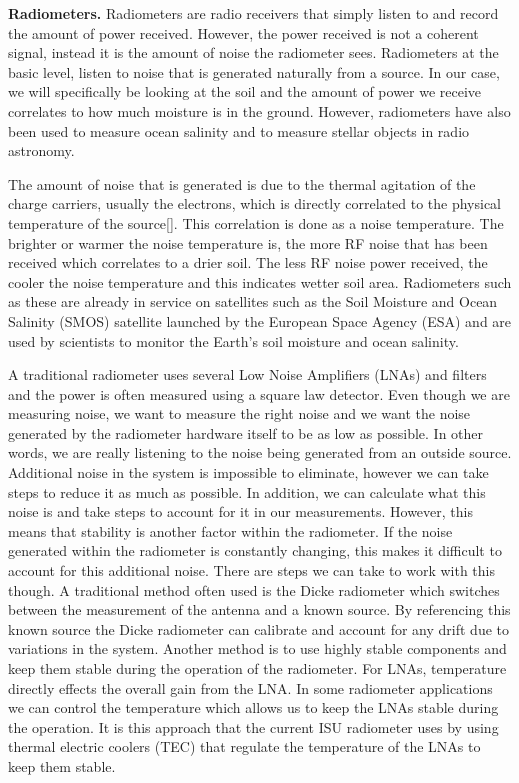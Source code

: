 \textbf{Radiometers.}  Radiometers are radio receivers that simply listen to and record the amount of power received.  However, the power received is not a coherent signal, instead it is the amount of noise the radiometer sees.  Radiometers at the basic level, listen to noise that is generated naturally from a source.  In our case, we will specifically be looking at the soil and the amount of power we receive correlates to how much moisture is in the ground.  However, radiometers have also been used to measure ocean salinity and to measure stellar objects in radio astronomy.  

The amount of noise that is generated is due to the thermal agitation of the charge carriers, usually the electrons, which is directly correlated to the physical temperature of the source[\cite{Nyquist1928thermal}].  This correlation is done as a noise temperature.  The brighter or warmer the noise temperature is, the more RF noise that has been received which correlates to a drier soil.  The less RF noise power received, the cooler the noise temperature and this indicates wetter soil area. Radiometers such as these are already in service on satellites such as the Soil Moisture and Ocean Salinity (SMOS) satellite launched by the European Space Agency (ESA) and are used by scientists to monitor the Earth's soil moisture and ocean salinity.  

A traditional radiometer uses several Low Noise Amplifiers (LNAs) and filters and the power is often measured using a square law detector.  Even though we are measuring noise, we want to measure the right noise and we want the noise generated by the radiometer hardware itself to be as low as possible.  In other words, we are really listening to the noise being generated from an outside source.  Additional noise in the system is impossible to eliminate, however we can take steps to reduce it as much as possible.  In addition, we can calculate what this noise is and take steps to account for it in our measurements.  However, this means that stability is another factor within the radiometer.  If the noise generated within the radiometer is constantly changing, this makes it difficult to account for this additional noise.  There are steps we can take to work with this though.  A traditional method often used is the Dicke radiometer which switches between the measurement of the antenna and a known source\cite{Dicke}.  By referencing this known source the Dicke radiometer can calibrate and account for any drift due to variations in the system.  Another method is to use highly stable components and keep them stable during the operation of the radiometer.  For LNAs, temperature directly effects the overall gain from the LNA.  In some radiometer applications we can control the temperature which allows us to keep the LNAs stable during the operation.  It is this approach that the current ISU radiometer uses by using thermal electric coolers (TEC) that  regulate the temperature of the LNAs to keep them stable.

